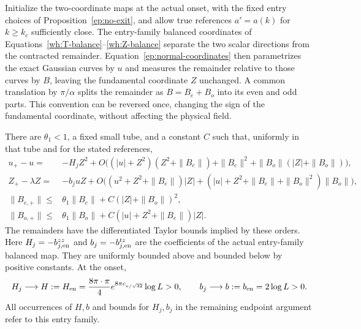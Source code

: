 Initialize the two-coordinate maps at the actual onset, with the
fixed entry choices of Proposition~\ref{ep:no-exit}, and allow
true references $a'=a(k)$ for $k\ge k_c$ sufficiently close.
The entry-family balanced coordinates of
Equations~\eqref{wh:T-balance}--\eqref{wh:Z-balance} separate the
two scalar directions from the contracted remainder.
Equation~\eqref{ep:normal-coordinates} then parametrizes the exact
Gaussian curves by $u$ and measures the remainder relative to
those curves by $B$, leaving the fundamental coordinate $Z$
unchanged.  A common translation by
$\pi/\alpha$ splits the remainder as $B=B_e+B_o$ into its
even and odd parts.  This convention can be reversed once,
changing the sign of the fundamental coordinate, without
affecting the physical field.

\begin{lemma}
\label{ep:parity-map}
There are $\theta_1<1$, a fixed small tube, and a constant $C$
such that, uniformly in that tube and for the stated references,
\begin{align}
 u_+-u={}&-H_jZ^2+
 O\bigl((|u|+Z^2)(Z^2+\|B_e\|)+\|B_e\|^2
              +\|B_o\|(|Z|+\|B_o\|)\bigr),\label{ep:u-map}\\
 Z_+-\lambda Z={}&-b_juZ+
 O\bigl((u^2+Z^2+\|B_e\|)|Z|
 +( |u|+Z^2+\|B_e\|+\|B_o\|^2)\|B_o\|\bigr),\label{ep:Z-map}\\
 \|B_{e,+}\|\le{}&\theta_1\|B_e\|
                      +C(|Z|+\|B_o\|)^2,\label{ep:Be-map}\\
 \|B_{o,+}\|\le{}&\theta_1\|B_o\|
                      +C(|u|+Z^2+\|B_e\|)|Z|.\label{ep:Bo-map}
\end{align}
The remainders have the differentiated Taylor bounds implied
by these orders.  Here $H_j=-b_{j,{\rm en}}^{zz}$ and
$b_j=-b_{j,{\rm en}}^{tz}$ are the coefficients of the actual
entry-family balanced map.  They are uniformly bounded above and
bounded below by positive constants.  At the onset,
\[
 H_j\longrightarrow H:=H_{\rm en}
   =\frac{8\pi\cdot\pi}{4}e^{8\pi c_{v/\sqrt{32}}}\log L>0,
 \qquad
 b_j\longrightarrow b:=b_{\rm en}=2\log L>0 .
\]
All occurrences of $H,b$ and bounds for $H_j,b_j$ in the remaining
endpoint argument refer to this entry family.
\end{lemma}

